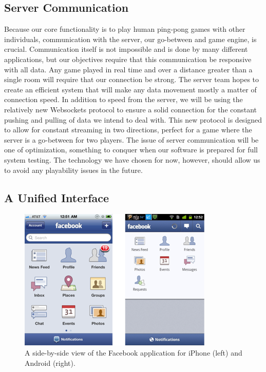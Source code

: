 \documentclass[12pt]{article}
\begin{document}
\subsection{Server Communication}
Because our core functionality is to play human ping-pong games with other individuals, communication with the server, our go-between and game engine, is crucial.  Communication itself is not impossible and is done by many different applications, but our objectives require that this communication be responsive with all data.  Any game played in real time and over a distance greater than a single room will require that our connection be strong.  The server team hopes to create an efficient system that will make any data movement mostly a matter of connection speed.  In addition to speed from the server, we will be using the relatively new Websockets protocol to ensure a solid connection for the constant pushing and pulling of data we intend to deal with.  This new protocol is designed to allow for constant streaming in two directions, perfect for a game where the server is a go-between for two players.  The issue of server communication will be one of optimization, something to conquer when our software is prepared for full system testing.  The technology we have chosen for now, however, should allow us to avoid any playability issues in the future.

\subsection{A Unified Interface}
\begin{figure}
\begin{center}
\includegraphics[scale=.5]{iphone_android_facebook_ui.png}
\caption{\label{facebook_android_ios}A side-by-side view of the Facebook application for iPhone (left) and Android (right).}
\end{center}
\end{figure}
\end{document}
